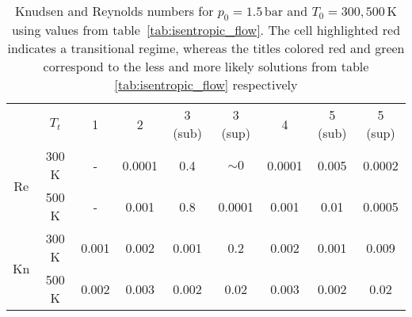 \begin{table}[H]
    \centering
    \begin{tabular}{|c|c|c|c|c|c|c|c|c|}
    \hline
    \multirow{2}{*}{} & \multirow{2}{*}{$T_t$}
    & \multirow{2}{*}{1} & \multirow{2}{*}{2} & \multirow{2}{*}{\color{greenColor} 3 (sub)}
    & \multirow{2}{*}{\color{redColor} 3 (sup)} & \multirow{2}{*}{4}
    & \multirow{2}{*}{\color{redColor} 5 (sub)} & \multirow{2}{*}{\color{greenColor}5 (sup)} \\
    & & & & & & & & \\ \hline

    \multirow{2}{*}{Re}
      & 300 K & - & 0.0001 & 0.4 & $\sim 0$ & 0.0001 & 0.005 & 0.0002 \\
      & 500 K & - & 0.001  & 0.8 & 0.0001   & 0.001  & 0.01  & 0.0005 \\ \hline

    \multirow{2}{*}{Kn}
      & 300 K & 0.001 & 0.002 & 0.001 & \cellcolor[HTML]{FFADA8}0.2
              & 0.002 & 0.001 & 0.009 \\
      & 500 K & 0.002 & 0.003 & 0.002 & 0.02
              & 0.003 & 0.002 & 0.02 \\ \hline
    \end{tabular}
    \caption{Knudsen and Reynolds numbers for $p_0 = 1.5\,\mathrm{bar}$ 
        and $T_0 = 300, 500\,\mathrm{K}$ using values from 
        table~\ref{tab:isentropic_flow}. The cell highlighted red indicates 
        a transitional regime, whereas the titles colored red and green correspond to the less and more likely solutions from table \ref{tab:isentropic_flow} respectively}
    \label{tab:test-knudsen-reynolds-isentropic}
\end{table}
